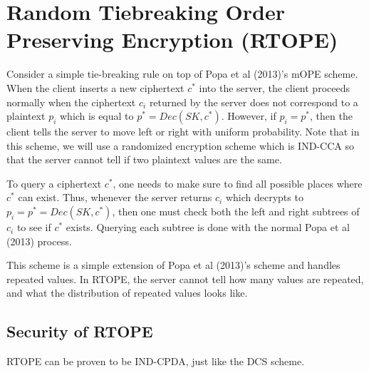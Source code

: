 \documentclass[12pt]{article}
\begin{document}
\section{Random Tiebreaking Order Preserving Encryption (RTOPE)}

  Consider a simple tie-breaking rule on top of Popa et al (2013)'s mOPE scheme. When the client inserts a new ciphertext $c^*$ into the server, the client proceeds normally when the ciphertext $c_i$ returned by the server does not correspond to a plaintext $p_i$ which is equal to $p^* = Dec(SK, c^*)$. However, if $p_i = p^*$, then the client tells the server to move left or right with uniform probability. Note that in this scheme, we will use a randomized encryption scheme which is IND-CCA so that the server cannot tell if two plaintext values are the same.

  To query a ciphertext $c^*$, one needs to make sure to find all possible places where $c^*$ can exist. Thus, whenever the server returns $c_i$ which decrypts to $p_i = p^* = Dec(SK, c^*)$, then one must check both the left and right subtrees of $c_i$ to see if $c^*$ exists. Querying each subtree is done with the  normal Popa et al (2013) process.

  This scheme is a simple extension of Popa et al (2013)'s scheme and handles repeated values. In RTOPE, the server cannot tell how many values are repeated, and what the distribution of repeated values looks like.

  \subsection{Security of RTOPE}

  RTOPE can be proven to be IND-CPDA, just like the DCS scheme.
\end{document}
